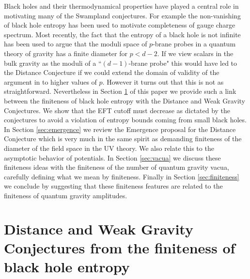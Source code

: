 \documentclass[11pt]{article}
\numberwithin{equation}{section}
\numberwithin{equation}{section}
\theoremstyle{remark}
\begin{document}
Black holes and their thermodynamical properties have played a central role in motivating many of the Swampland conjectures.
For example the non-vanishing of black hole entropy has been used to motivate completeness of gauge charge spectrum.  
Most recently, the fact that the entropy of a black hole is not infinite has been used \cite{Hamada:2021bbz,Bedroya:2021fbu} to argue that the moduli space of $p$-brane probes in a quantum theory of gravity has a finite diameter for $p< d-2$.   If we view scalars in the bulk gravity as the moduli of a ``$(d-1)$-brane probe" this would have led to the Distance Conjecture if we could extend the domain of validity of the argument in \cite{Hamada:2021bbz,Bedroya:2021fbu} to higher values of $p$. However it turns out that this is not as straightforward.  Nevertheless in Section \ref{sec:blackhole} of this paper we provide such a link between the finiteness of black hole entropy with the Distance and Weak Gravity Conjectures. We show that the EFT cutoff must decrease as dictated by the conjectures to avoid a violation of entropy bounds coming from small black holes.   In Section \ref{sec:emergence} we review the Emergence proposal for the Distance Conjecture \cite{Grimm:2018ohb,Heidenreich:2018kpg} which is very much in the same spirit as demanding finiteness of the diameter of the field space in the UV theory.  We also relate this to the asymptotic behavior of potentials.
In Section \ref{sec:vacua} we discuss these finiteness ideas with the finiteness of the number of quantum gravity vacua, carefully defining what we mean by finiteness.  Finally in Section \ref{sec:finiteness} we conclude by suggesting that these finiteness features are related to the finiteness of quantum gravity amplitudes.

 
\label{sec:intro}

\section{Distance and Weak Gravity Conjectures from the finiteness of black hole entropy}  \label{sec:blackhole}
\end{document}
